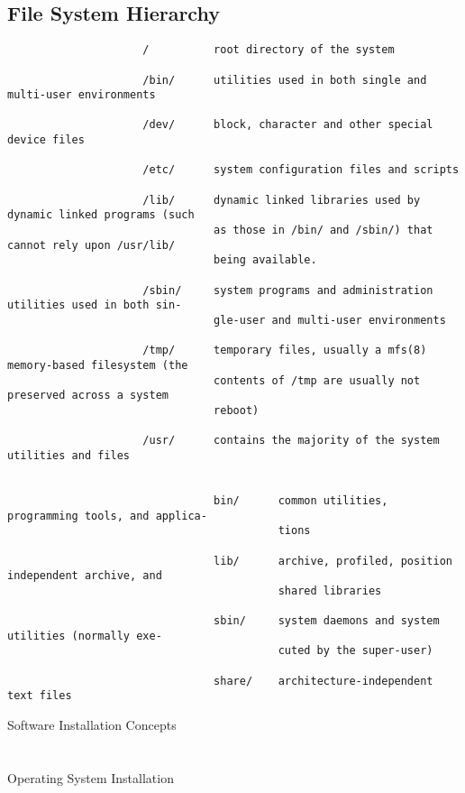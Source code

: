 \documentclass[xga]{xdvislides}
\begin{document}
\subsection{File System Hierarchy}
\small
\begin{verbatim}
                     /          root directory of the system

                     /bin/      utilities used in both single and multi-user environments

                     /dev/      block, character and other special device files

                     /etc/      system configuration files and scripts

                     /lib/      dynamic linked libraries used by dynamic linked programs (such
                                as those in /bin/ and /sbin/) that cannot rely upon /usr/lib/
                                being available.

                     /sbin/     system programs and administration utilities used in both sin-
                                gle-user and multi-user environments

                     /tmp/      temporary files, usually a mfs(8) memory-based filesystem (the
                                contents of /tmp are usually not preserved across a system
                                reboot)

                     /usr/      contains the majority of the system utilities and files


                                bin/      common utilities, programming tools, and applica-
                                          tions

                                lib/      archive, profiled, position independent archive, and
                                          shared libraries

                                sbin/     system daemons and system utilities (normally exe-
                                          cuted by the super-user)

                                share/    architecture-independent text files
\end{verbatim}
\Normalsize

\newpage
\vspace*{\fill}
\begin{center}
	\Hugesize
		Software Installation Concepts \\ [1em]
	\hspace*{5mm}
	\blueline\\
	\hspace*{5mm}\\
		Operating System Installation
\end{center}
\vspace*{\fill}
\end{document}
